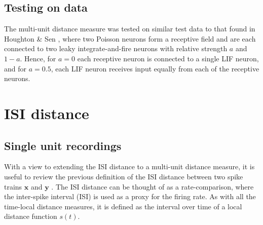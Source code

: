  \subsection{Testing on data}
% 
%

 The multi-unit distance measure was tested on similar test data to that found in Houghton \& Sen \cite{HoughtonSen2008}, where two Poisson neurons form a receptive field and are each connected to two leaky integrate-and-fire neurons with relative strength $a$ and $1-a$.  Hence, for $a=0$ each receptive neuron is connected to a single LIF neuron, and for $a=0.5$, each LIF neuron receives input equally from each of the receptive neurons.  
%
%
\begin{figure}[htb]

\end{figure}

\begin{figure}[htb]

\end{figure}

\newpage
\section{ISI distance}
\bigskip
\subsection{Single unit recordings}

With a view to extending the ISI distance to a multi-unit distance measure, it is useful to review the previous definition of the ISI distance between two spike trains $\mathbf{x}$ and $\mathbf{y}$ .  The ISI distance can be thought of as a rate-comparison, where the inter-spike interval (ISI) is used as a proxy for the firing rate.  As with all the time-local distance measures, it is defined as the interval over time of a local distance function $s(t)$.

